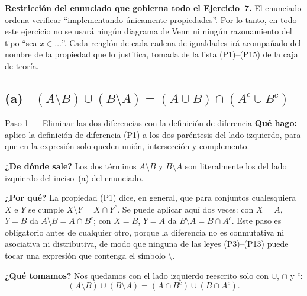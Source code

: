 \documentclass[11pt]{article}
\begin{document}
\begin{nota}
\textbf{Restricción del enunciado que gobierna todo el Ejercicio~7.}
El enunciado ordena verificar ``implementando únicamente propiedades''. Por lo tanto, en todo
este ejercicio no se usará ningún diagrama de Venn ni ningún razonamiento del tipo ``sea
$x\in\dots$''. Cada renglón de cada cadena de igualdades irá acompañado del nombre de la
propiedad que lo justifica, tomada de la lista (P1)--(P15) de la caja de teoría.
\end{nota}

\subsection*{(a) \ $(A\setminus B)\cup(B\setminus A)=(A\cup B)\cap(A^{c}\cup B^{c})$}

\begin{paso}{Paso 1 --- Eliminar las dos diferencias con la definición de diferencia}
\textbf{Qué hago:} aplico la definición de diferencia (P1) a los dos paréntesis del lado
izquierdo, para que en la expresión solo queden unión, intersección y complemento.

\textbf{¿De dónde sale?} Los dos términos $A\setminus B$ y $B\setminus A$ son literalmente los
del lado izquierdo del inciso~(a) del enunciado.

\textbf{¿Por qué?} La propiedad (P1) dice, en general, que para conjuntos cualesquiera $X$ e $Y$
se cumple $X\setminus Y=X\cap Y^{c}$. Se puede aplicar aquí dos veces: con $X=A$, $Y=B$ da
$A\setminus B=A\cap B^{c}$; con $X=B$, $Y=A$ da $B\setminus A=B\cap A^{c}$. Este paso es
obligatorio antes de cualquier otro, porque la diferencia no es conmutativa ni asociativa ni
distributiva, de modo que ninguna de las leyes (P3)--(P13) puede tocar una expresión que
contenga el símbolo $\setminus$.

\textbf{¿Qué tomamos?} Nos quedamos con el lado izquierdo reescrito solo con $\cup$, $\cap$ y
$^{c}$:
\[
(A\setminus B)\cup(B\setminus A)=(A\cap B^{c})\cup(B\cap A^{c}).
\]
\end{paso}
\end{document}
